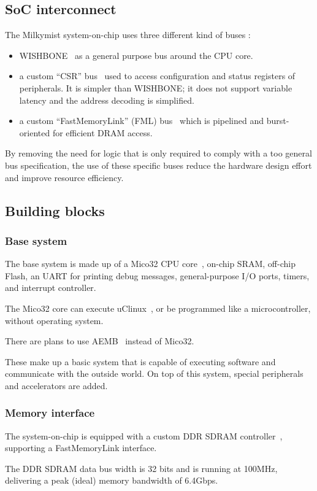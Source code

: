 \documentclass[a4paper,11pt,twocolumn]{paper}
\begin{document}
\subsection{SoC interconnect}
The Milkymist system-on-chip uses three different kind of buses :
\begin{itemize}
\item WISHBONE~\cite{wishbone} as a general purpose bus around the CPU core.
\item a custom ``CSR'' bus~\cite{csr} used to access configuration and status registers of peripherals. It is simpler than WISHBONE; it does not support variable latency and the address decoding is simplified.
\item a custom ``FastMemoryLink'' (FML) bus~\cite{fml} which is pipelined and burst-oriented for efficient DRAM access.
\end{itemize}
By removing the need for logic that is only required to comply with a too general bus specification, the use of these specific buses reduce the hardware design effort and improve resource efficiency.

\subsection{Building blocks}
\subsubsection{Base system}
The base system is made up of a Mico32 CPU core~\cite{mico32}, on-chip SRAM, off-chip Flash, an UART for printing debug messages, general-purpose I/O ports, timers, and interrupt controller.

The Mico32 core can execute uClinux~\cite{micolinux}, or be programmed like a microcontroller, without operating system.

There are plans to use AEMB~\cite{aemb} instead of Mico32.

These make up a basic system that is capable of executing software and communicate with the outside world. On top of this system, special peripherals and accelerators are added.

\subsubsection{Memory interface}
The system-on-chip is equipped with a custom DDR SDRAM controller~\cite{hpdmc}, supporting a FastMemoryLink interface.

The DDR SDRAM data bus width is 32 bits and is running at 100MHz, delivering a peak (ideal) memory bandwidth of 6.4Gbps.
\end{document}
